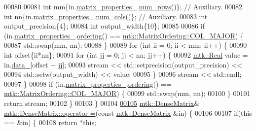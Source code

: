 \begin{DoxyCode}
00080 
00081   \textcolor{keywordtype}{int} mm\{in.\hyperlink{classmtk_1_1DenseMatrix_a481c8d09af685a5ba67acefdcaa810cc}{matrix\_properties\_}.\hyperlink{classmtk_1_1Matrix_ab308b25b48e4fcd39fc60e0c3fc66dea}{num\_rows}()\};  \textcolor{comment}{// Auxiliary.}
00082   \textcolor{keywordtype}{int} nn\{in.\hyperlink{classmtk_1_1DenseMatrix_a481c8d09af685a5ba67acefdcaa810cc}{matrix\_properties\_}.\hyperlink{classmtk_1_1Matrix_a2160118d0edf51cf2aaa806ee1b915f8}{num\_cols}()\};  \textcolor{comment}{// Auxiliary.}
00083   \textcolor{keywordtype}{int} output\_precision\{4\};
00084   \textcolor{keywordtype}{int} output\_width\{10\};
00085 
00086   \textcolor{keywordflow}{if} (in.\hyperlink{classmtk_1_1DenseMatrix_a481c8d09af685a5ba67acefdcaa810cc}{matrix\_properties\_}.\hyperlink{classmtk_1_1Matrix_a13cd17621652cd5551ff98549bd94df7}{ordering}() == 
      \hyperlink{namespacemtk_ga622801bd9f912d0f976c3e383f5f581ca34d2765ffc490951febdcca04bc4f7cd}{mtk::MatrixOrdering::COL\_MAJOR}) \{
00087     std::swap(mm, nn);
00088   \}
00089   \textcolor{keywordflow}{for} (\textcolor{keywordtype}{int} ii = 0; ii < mm; ii++) \{
00090     \textcolor{keywordtype}{int} offset\{ii*nn\};
00091     \textcolor{keywordflow}{for} (\textcolor{keywordtype}{int} jj = 0; jj < nn; jj++) \{
00092       \hyperlink{group__c01-roots_gac080bbbf5cbb5502c9f00405f894857d}{mtk::Real} value = in.\hyperlink{classmtk_1_1DenseMatrix_a7893e4e5c8d2e2de32b156177e78cb6f}{data\_}[offset + jj];
00093       stream << std::setprecision(output\_precision) <<
00094         std::setw(output\_width) << value;
00095     \}
00096     stream << std::endl;
00097   \}
00098   \textcolor{keywordflow}{if} (in.\hyperlink{classmtk_1_1DenseMatrix_a481c8d09af685a5ba67acefdcaa810cc}{matrix\_properties\_}.\hyperlink{classmtk_1_1Matrix_a13cd17621652cd5551ff98549bd94df7}{ordering}() == 
      \hyperlink{namespacemtk_ga622801bd9f912d0f976c3e383f5f581ca34d2765ffc490951febdcca04bc4f7cd}{mtk::MatrixOrdering::COL\_MAJOR}) \{
00099     std::swap(mm, nn);
00100   \}
00101   \textcolor{keywordflow}{return} stream;
00102 \}
00103 \}
00104 
\hypertarget{mtk__dense__matrix_8cc_source_l00105}{}\hyperlink{classmtk_1_1DenseMatrix_a0d27dc7c4d2c49f391017e392345ced0}{00105} \hyperlink{classmtk_1_1DenseMatrix}{mtk::DenseMatrix}& \hyperlink{classmtk_1_1DenseMatrix_a0d27dc7c4d2c49f391017e392345ced0}{mtk::DenseMatrix::operator =}(\textcolor{keyword}{const} 
      \hyperlink{classmtk_1_1DenseMatrix}{mtk::DenseMatrix} &in) \{
00106 
00107   \textcolor{keywordflow}{if}(\textcolor{keyword}{this} == &in) \{
00108     \textcolor{keywordflow}{return} *\textcolor{keyword}{this};

\end{DoxyCode}
